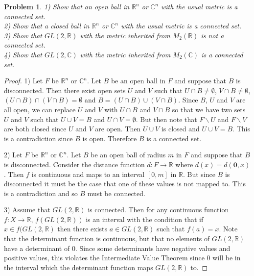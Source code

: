 \documentclass{article}
\newtheorem{problem}{Problem}
\begin{document}
\begin{flushleft}
\begin{problem}
1) Show that an open ball in $\mathbb{R}^n$ or $\mathbb{C}^n$ with the usual metric is a connected set.\\
2) Show that a closed ball in $\mathbb{R}^n$ or $\mathbb{C}^n$ with the usual metric is a connected set.\\
3) Show that $GL(2, \mathbb{R})$ with the metric inherited from $M_2(\mathbb{R})$ is not a connected set.\\
4) Show that $GL(2, \mathbb{C})$ with the metric inherited from $M_2(\mathbb{C})$ is a connected set.
\end{problem}
\begin{proof}
1) Let $F$ be $\mathbb{R}^n$ or $\mathbb{C}^n$. Let $B$ be an open ball in $F$ and suppose that $B$ is disconnected. Then there exist open sets $U$ and $V$ such that $U \cap B \neq \emptyset$, $V \cap B \neq \emptyset$, $(U \cap B) \cap (V \cap B) = \emptyset$ and $B = (U \cap B) \cup (V \cap B)$. Since $B$, $U$ and $V$ are all open, we can replace $U$ and $V$ with $U \cap B$ and $V \cap B$ so that we have two sets $U$ and $V$ such that $U \cup V = B$ and $U \cap V = \emptyset$. But then note that $F \backslash U$ and $F \backslash V$ are both closed since $U$ and $V$ are open. Then $U \cup V$ is closed and $U \cup V = B$. This is a contradiction since $B$ is open. Therefore $B$ is a connected set.\newline

2) Let $F$ be $\mathbb{R}^n$ or $\mathbb{C}^n$. Let $B$ be an open ball of radius $m$ in $F$ and suppose that $B$ is disconnected. Consider the distance function $d : F \rightarrow \mathbb{R}$ where $d(x) = d(\mathbf{0}, x)$. Then $f$ is continuous and maps to an interval $[0, m]$ in $\mathbb{R}$. But since $B$ is disconnected it must be the case that one of these values is not mapped to. This is a contradiction and so $B$ must be connected.\newline

3) Assume that $GL(2, \mathbb{R})$ is connected. Then for any continuous function $f : X \rightarrow \mathbb{R}$, $f(GL(2, \mathbb{R}))$ is an interval with the condition that if $x \in f(GL(2, \mathbb{R})$ then there exists $a \in GL(2, \mathbb{R})$ such that $f(a) = x$. Note that the determinant function is continuous, but that no elements of $GL(2, \mathbb{R})$ have a determinant of $0$. Since some determinants have negative values and positive values, this violates the Intermediate Value Theorem since $0$ will be in the interval which the determinant function maps $GL(2, \mathbb{R})$ to.\newline


\end{proof}
\end{flushleft}
\end{document}

